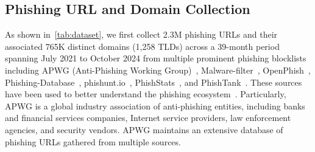 



\subsection{Phishing URL and Domain Collection}
\label{sec:collection:phishing:domain}
As shown in~\autoref{tab:dataset}, we first collect 2.3M phishing URLs and their associated 765K distinct domains (1,258 TLDs) across a 39-month period spanning July 2021 to October 2024 
from multiple prominent phishing blocklists including APWG (Anti-Phishing Working Group)~\cite{APWGTheA83:online}, Malware-filter~\cite{curbengh9:online}, 
OpenPhish~\cite{OpenPhis99:online}, 
Phishing-Database~\cite{mitchell17:online}, 
phishunt.io~\cite{phishunt94:online},
PhishStats~\cite{PhishSta46:online},
and PhishTank~\cite{PhishTan96:online}.
These sources have been used to better understand the phishing ecosystem~\cite{oest2020phishtime,oest2019phishfarm,kim2021security,lim2024phishing,oest2020sunrise,8376206}.
Particularly, APWG is a global industry association of anti-phishing entities, including banks and financial services companies, Internet service providers, law enforcement agencies, and security vendors.
APWG maintains an extensive database of phishing URLs gathered from multiple sources. 






